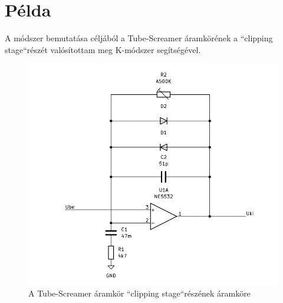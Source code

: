 \section{Példa}
A módszer bemutatása céljából a Tube-Screamer áramkörének a ``clipping stage``részét valósítottam meg K-módszer segítségével. 

\begin{figure}[H]
    \centering
    \includegraphics[scale=0.9]{figures/TSCS.png}
    \caption{A Tube-Screamer áramkör ``clipping stage``részének áramköre}
\end{figure}

